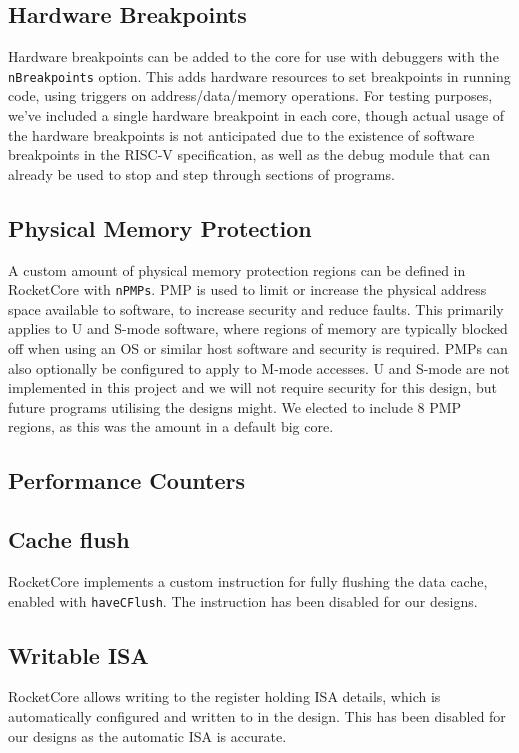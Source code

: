 \subsection{Hardware Breakpoints}
Hardware breakpoints can be added to the core for use with debuggers with the \texttt{nBreakpoints} option. This adds hardware resources to set breakpoints in running code, using triggers on address/data/memory operations. For testing purposes, we've included a single hardware breakpoint in each core, though actual usage of the hardware breakpoints is not anticipated due to the existence of software breakpoints in the RISC-V specification, as well as the debug module that can already be used to stop and step through sections of programs.

\subsection{Physical Memory Protection}
A custom amount of physical memory protection regions can be defined in RocketCore with \texttt{nPMPs}. PMP is used to limit or increase the physical address space available to software, to increase security and reduce faults. This primarily applies to U and S-mode software, where regions of memory are typically blocked off when using an OS or similar host software and security is required. PMPs can also optionally be configured to apply to M-mode accesses. U and S-mode are not implemented in this project and we will not require security for this design, but future programs utilising the designs might. We elected to include 8 PMP regions, as this was the amount in a default big core.

\subsection{Performance Counters} %

\subsection{Cache flush}
RocketCore implements a custom instruction for fully flushing the data cache, enabled with \texttt{haveCFlush}. The instruction has been disabled for our designs.

\subsection{Writable ISA}
RocketCore allows writing to the register holding ISA details, which is automatically configured and written to in the design. This has been disabled for our designs as the automatic ISA is accurate.

